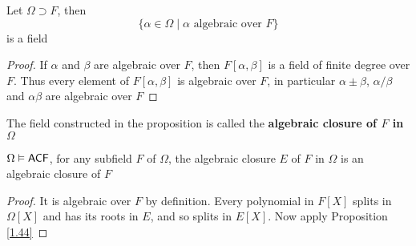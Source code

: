 \documentclass[11pt]{article}
\begin{document}
\begin{proposition}[]
Let \(\Omega\supset F\), then
\begin{equation*}
\{\alpha\in\Omega\mid\alpha\text{ algebraic over }F\}
\end{equation*}
is a field
\end{proposition}

\begin{proof}
If \(\alpha\) and \(\beta\) are algebraic over \(F\), then \(F[\alpha,\beta]\) is a field of finite degree over \(F\).
Thus every element of \(F[\alpha,\beta]\) is algebraic over \(F\), in particular \(\alpha\pm\beta\), \(\alpha/\beta\)
and \(\alpha\beta\) are algebraic over \(F\)
\end{proof}

The field constructed in the proposition is called the \textbf{algebraic closure of \(F\) in \(\Omega\)}

\begin{corollary}[]
\(\Omega\vDash\textsf{ACF}\), for any subfield \(F\) of \(\Omega\), the algebraic closure \(E\) of \(F\)  in \(\Omega\) is an
algebraic closure of \(F\)
\end{corollary}

\begin{proof}
It is algebraic over \(F\) by definition. Every polynomial in \(F[X]\) splits in \(\Omega[X]\) and
has its roots in \(E\), and so splits in \(E[X]\). Now apply Proposition \ref{1.44}
\end{proof}
\end{document}
